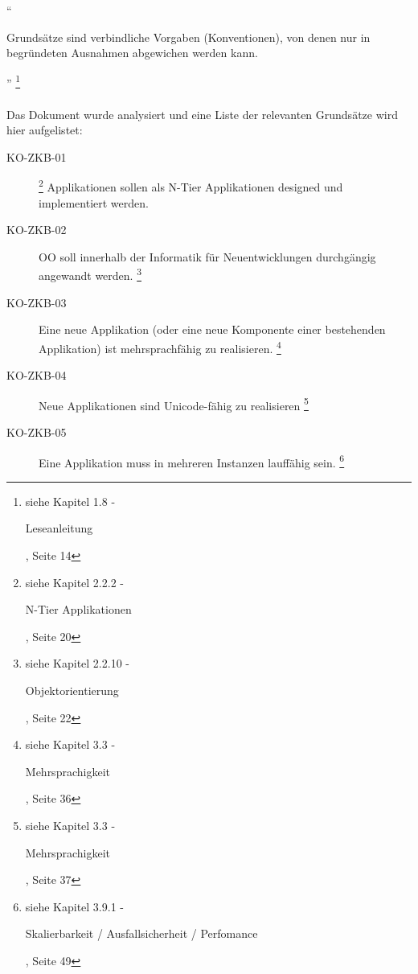\documentclass[abstracton, listof=totocnumbered,
bibliography=totocnumbered]{scrreprt}
\begin{document}
  ``\begin{itshape}Grundsätze sind verbindliche Vorgaben (Konventionen), von
  denen nur in begründeten Ausnahmen abgewichen werden kann.\end{itshape}''
  \footnote{siehe Kapitel 1.8 - \begin{itshape}Leseanleitung\end{itshape},
  Seite 14}
  \\
  \\
  \noindent
  Das Dokument wurde analysiert und eine Liste der relevanten
  Grundsätze wird hier aufgelistet:
  
  \begin{description}

    \item[KO-ZKB-01]
    \footnote{siehe Kapitel 2.2.2 - \begin{itshape}N-Tier
    Applikationen\end{itshape}, Seite 20}
    Applikationen sollen als N-Tier Applikationen designed und
    implementiert werden.

    \item[KO-ZKB-02] \ac{OO} soll innerhalb der Informatik für Neuentwicklungen
    durchgängig angewandt werden.
    \footnote{siehe Kapitel 2.2.10 -
    \begin{itshape}Objektorientierung\end{itshape}, Seite 22}

    \item[KO-ZKB-03] Eine neue Applikation (oder eine neue Komponente einer
    bestehenden Applikation) ist mehrsprachfähig zu realisieren.
    \footnote{siehe Kapitel 3.3 -
    \begin{itshape}Mehrsprachigkeit\end{itshape}, Seite 36}

    \item[KO-ZKB-04] Neue Applikationen sind Unicode-fähig zu realisieren
    \footnote{siehe Kapitel 3.3 -
    \begin{itshape}Mehrsprachigkeit\end{itshape}, Seite 37}

    \item[KO-ZKB-05] Eine Applikation muss in mehreren Instanzen lauffähig sein.
    \footnote{siehe Kapitel 3.9.1 -
    \begin{itshape}Skalierbarkeit / Ausfallsicherheit / Perfomance\end{itshape},
    Seite 49}


\end{description}
\end{document}
